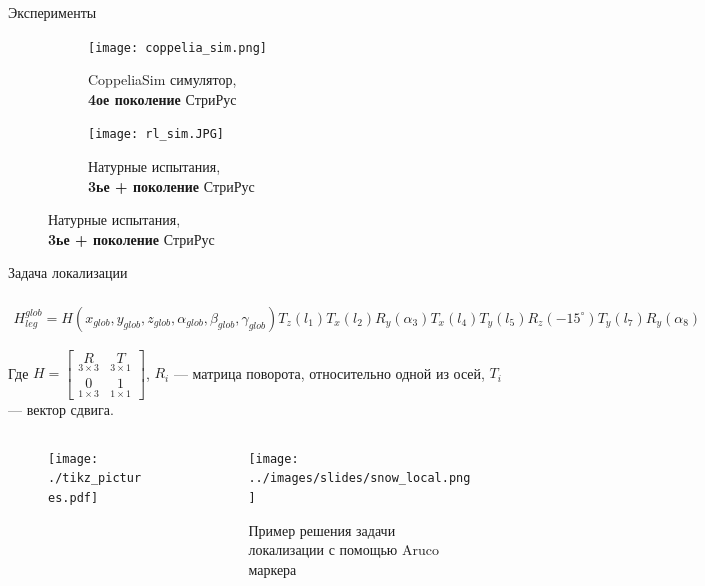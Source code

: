 
\begin{frame}[t]{Эксперименты}
    \begin{figure}[H]
        \begin{subfigure}[t]{0.49\textwidth}
            \centering\texttt{[image: coppelia\_sim.png]}
            \caption*{CoppeliaSim симулятор,\\ \textbf{4ое поколение} СтриРус}
        \end{subfigure}
        \begin{subfigure}[t]{0.49\textwidth}
            \centering\texttt{[image: rl\_sim.JPG]}
            \caption*{Натурные испытания,\\ \textbf{3ье + поколение} СтриРус}
        \end{subfigure}
    \end{figure}
\end{frame}


\begin{frame}[t]{Задача локализации}
\framesubtitle{}
\begin{multline}
        H_{leg}^{glob} = H(x_{glob},y_{glob},z_{glob},\alpha_{glob},\beta_{glob},\gamma_{glob})T_z(l_1)T_x(l_2)R_y(\alpha_3)T_x(l_4)T_y(l_5)R_z(-15^{\circ})T_y(l_7)R_y(\alpha_8)
\end{multline}

\vspace{-0.3cm}
Где $H = \begin{bmatrix}
    \underset{3 \times 3}{R} & \underset{3 \times 1}{T} \\
    \underset{1 \times 3}{0} & \underset{1 \times 1}{1}
\end{bmatrix}$, $R_i$ --- матрица поворота, относительно одной из осей, $T_i$ --- вектор сдвига.

    \begin{columns}[T,onlytextwidth]
        \begin{column}{0.69\textwidth}
            
            \vspace{-0.3cm}
            \begin{figure}[H]
        \centering
        \centering\texttt{[image: ./tikz\_pictures.pdf]}
    \end{figure}
        \end{column}
        \begin{column}{0.29\textwidth}
            \begin{figure}[H]
                \centering\texttt{[image: ../images/slides/snow\_local.png]}
                \caption{Пример решения задачи локализации с помощью Aruco маркера}
            \end{figure}
        \end{column}
    \end{columns}
\end{frame}

